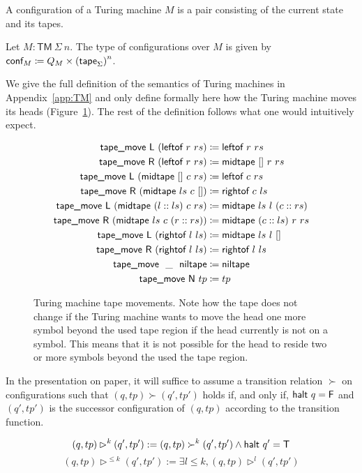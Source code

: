 A configuration of a Turing machine $M$ is a pair consisting of the current state and its tapes.
\begin{definition}[Configurations]
  Let $M : \textsf{TM}~\Sigma~n$. The type of configurations over $M$ is given by 
  $\textsf{conf}_{M} \coloneqq Q_{M} \times {(\textsf{tape}_{\Sigma})}^n$.
\end{definition}

We give the full definition of the semantics of Turing machines in Appendix~\ref{app:TM} and only define formally here how the Turing machine moves its heads (Figure~\ref{fig:movetape}). The rest of the definition follows what one would intuitively expect.

\newcommand{\tmleftof}{\textsf{leftof}}
\newcommand{\tmrightof}{\textsf{rightof}}
\newcommand{\tmniltape}{\textsf{niltape}}
\newcommand{\tmmidtape}{\textsf{midtape}}
\newcommand{\tapemove}{\textsf{tape\_move}}
\begin{figure}
  \begin{align*}
    \tapemove~\movel~(\tmleftof~r~rs) &\defeq \tmleftof~r~rs \\
    \tapemove~\mover~(\tmleftof~r~rs) &\defeq \tmmidtape~\nil~r~rs \\
    \tapemove~\movel~(\tmmidtape~\nil~c~rs) &\defeq \tmleftof~c~rs \\
    \tapemove~\mover~(\tmmidtape~ls~c~\nil) &\defeq \tmrightof~c~ls \\
    \tapemove~\movel~(\tmmidtape~(l::ls)~c~rs) &\defeq \tmmidtape~ls~l~(c ::rs) \\
    \tapemove~\mover~(\tmmidtape~ls~c~(r::rs)) &\defeq \tmmidtape~(c::ls)~r~rs \\
    \tapemove~\movel~(\tmrightof~l~ls) &\defeq \tmmidtape~ls~l~\nil \\
    \tapemove~\mover~(\tmrightof~l~ls) &\defeq \tmrightof~l~ls \\
    \tapemove~~\_~~\tmniltape &\defeq \tmniltape \\
    \tapemove~\moven~tp &\defeq tp
  \end{align*}
  \caption{Turing machine tape movements. Note how the tape does not change if the Turing machine wants to move the head one more symbol beyond the used tape region if the head currently is not on a symbol. This means that it is not possible for the head to reside two or more symbols beyond the used the tape region.}\label{fig:movetape}
\end{figure}

In the presentation on paper, it will suffice to assume a transition relation $\succ$ on configurations such that 
$(q, tp) \succ (q', tp')$ holds if, and only if, $\textsf{halt}~q = \mathsf{F}$ and $(q', tp')$ is the successor configuration of $(q, tp)$ according to the transition function. 
\begin{definition}
  \[ (q, tp) \rhd^{k} (q', tp') := (q, tp) \succ^k (q', tp') \land \textsf{halt}~q' = \mathsf{T}\]
  \[ (q, tp) \rhd^{\le k} (q', tp') := \exists l \le k, (q, tp) \rhd^l (q', tp') \]
\end{definition}

